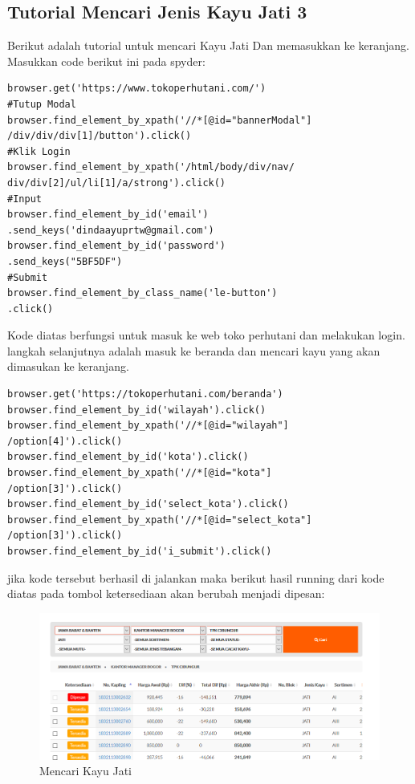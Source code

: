 \subsection{Tutorial Mencari Jenis Kayu Jati 3}
Berikut adalah tutorial untuk mencari Kayu Jati Dan memasukkan ke keranjang. Masukkan code berikut ini pada spyder:
\begin{verbatim}
browser.get('https://www.tokoperhutani.com/')
#Tutup Modal
browser.find_element_by_xpath('//*[@id="bannerModal"]
/div/div/div[1]/button').click()
#Klik Login
browser.find_element_by_xpath('/html/body/div/nav/
div/div[2]/ul/li[1]/a/strong').click()
#Input 
browser.find_element_by_id('email')
.send_keys('dindaayuprtw@gmail.com')
browser.find_element_by_id('password')
.send_keys("5BF5DF")
#Submit
browser.find_element_by_class_name('le-button')
.click()
\end{verbatim}

Kode diatas berfungsi untuk masuk ke web toko perhutani dan melakukan login.
langkah selanjutnya adalah masuk ke beranda dan mencari kayu yang akan dimasukan ke keranjang.

\begin{verbatim}
browser.get('https://tokoperhutani.com/beranda')
browser.find_element_by_id('wilayah').click()
browser.find_element_by_xpath('//*[@id="wilayah"]
/option[4]').click()
browser.find_element_by_id('kota').click()
browser.find_element_by_xpath('//*[@id="kota"]
/option[3]').click()
browser.find_element_by_id('select_kota').click()
browser.find_element_by_xpath('//*[@id="select_kota"]
/option[3]').click()
browser.find_element_by_id('i_submit').click()
\end{verbatim}

\newpage
jika kode tersebut berhasil di jalankan maka berikut hasil running dari kode diatas pada tombol ketersediaan akan berubah menjadi dipesan:
\begin{figure}[h]
	\centering
	\includegraphics[scale=0.3]{figures/6keranjang}
	\caption{Mencari Kayu Jati}
\end{figure}

